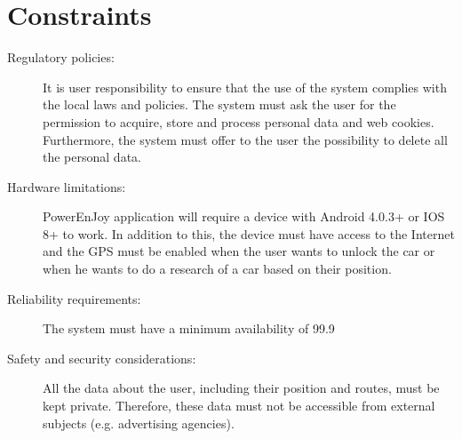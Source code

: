 \section{Constraints}
\begin{description}
\item[Regulatory policies:] It is user responsibility to ensure that the use of the system complies with the
local laws and policies.
The system must ask the user for the permission to acquire, store and process personal data and web cookies. Furthermore, the system must offer to the user the possibility to delete all the personal data.
\item[Hardware limitations:] PowerEnJoy application will require a device with Android 4.0.3+ or IOS 8+ to work. In addition to this, the device must have access to the Internet and the GPS must be enabled when the user wants to unlock the car or when he wants to do a research of a car based on their position.
\item[Reliability requirements:] The system must have a minimum availability of 99.9%
\item[Safety and security considerations:] All the data about the user, including their position and routes, must be kept private.
Therefore, these data must not be accessible from external subjects (e.g. advertising agencies).
\end{description}
